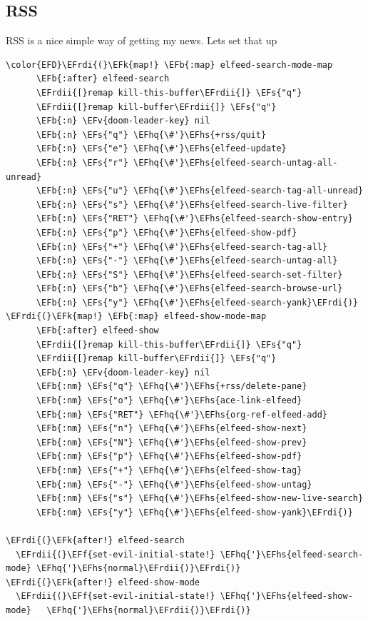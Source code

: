 \documentclass{scrartcl}
\newcommand{\EFk}[1]{\textcolor{EFk}{#1}} %
\newcommand{\EFs}[1]{\textcolor{EFs}{#1}} %
\newcommand{\EFb}[1]{\textcolor{EFb}{#1}} %
\newcommand{\EFv}[1]{\textcolor{EFv}{#1}} %
\newcommand{\EFf}[1]{\textcolor{EFf}{#1}} %
\newcommand{\EFhq}[1]{#1} %
\newcommand{\EFhs}[1]{#1} %
\newcommand{\EFrdi}[1]{#1} %
\newcommand{\EFrdii}[1]{#1} %
\begin{document}
\subsection{RSS}
\label{sec:org187bbc8}
RSS is a nice simple way of getting my news. Lets set that up
\begin{Code}
\begin{Verbatim}[]
\color{EFD}\EFrdi{(}\EFk{map!} \EFb{:map} elfeed-search-mode-map
      \EFb{:after} elfeed-search
      \EFrdii{[}remap kill-this-buffer\EFrdii{]} \EFs{"q"}
      \EFrdii{[}remap kill-buffer\EFrdii{]} \EFs{"q"}
      \EFb{:n} \EFv{doom-leader-key} nil
      \EFb{:n} \EFs{"q"} \EFhq{\#'}\EFhs{+rss/quit}
      \EFb{:n} \EFs{"e"} \EFhq{\#'}\EFhs{elfeed-update}
      \EFb{:n} \EFs{"r"} \EFhq{\#'}\EFhs{elfeed-search-untag-all-unread}
      \EFb{:n} \EFs{"u"} \EFhq{\#'}\EFhs{elfeed-search-tag-all-unread}
      \EFb{:n} \EFs{"s"} \EFhq{\#'}\EFhs{elfeed-search-live-filter}
      \EFb{:n} \EFs{"RET"} \EFhq{\#'}\EFhs{elfeed-search-show-entry}
      \EFb{:n} \EFs{"p"} \EFhq{\#'}\EFhs{elfeed-show-pdf}
      \EFb{:n} \EFs{"+"} \EFhq{\#'}\EFhs{elfeed-search-tag-all}
      \EFb{:n} \EFs{"-"} \EFhq{\#'}\EFhs{elfeed-search-untag-all}
      \EFb{:n} \EFs{"S"} \EFhq{\#'}\EFhs{elfeed-search-set-filter}
      \EFb{:n} \EFs{"b"} \EFhq{\#'}\EFhs{elfeed-search-browse-url}
      \EFb{:n} \EFs{"y"} \EFhq{\#'}\EFhs{elfeed-search-yank}\EFrdi{)}
\EFrdi{(}\EFk{map!} \EFb{:map} elfeed-show-mode-map
      \EFb{:after} elfeed-show
      \EFrdii{[}remap kill-this-buffer\EFrdii{]} \EFs{"q"}
      \EFrdii{[}remap kill-buffer\EFrdii{]} \EFs{"q"}
      \EFb{:n} \EFv{doom-leader-key} nil
      \EFb{:nm} \EFs{"q"} \EFhq{\#'}\EFhs{+rss/delete-pane}
      \EFb{:nm} \EFs{"o"} \EFhq{\#'}\EFhs{ace-link-elfeed}
      \EFb{:nm} \EFs{"RET"} \EFhq{\#'}\EFhs{org-ref-elfeed-add}
      \EFb{:nm} \EFs{"n"} \EFhq{\#'}\EFhs{elfeed-show-next}
      \EFb{:nm} \EFs{"N"} \EFhq{\#'}\EFhs{elfeed-show-prev}
      \EFb{:nm} \EFs{"p"} \EFhq{\#'}\EFhs{elfeed-show-pdf}
      \EFb{:nm} \EFs{"+"} \EFhq{\#'}\EFhs{elfeed-show-tag}
      \EFb{:nm} \EFs{"-"} \EFhq{\#'}\EFhs{elfeed-show-untag}
      \EFb{:nm} \EFs{"s"} \EFhq{\#'}\EFhs{elfeed-show-new-live-search}
      \EFb{:nm} \EFs{"y"} \EFhq{\#'}\EFhs{elfeed-show-yank}\EFrdi{)}

\EFrdi{(}\EFk{after!} elfeed-search
  \EFrdii{(}\EFf{set-evil-initial-state!} \EFhq{'}\EFhs{elfeed-search-mode} \EFhq{'}\EFhs{normal}\EFrdii{)}\EFrdi{)}
\EFrdi{(}\EFk{after!} elfeed-show-mode
  \EFrdii{(}\EFf{set-evil-initial-state!} \EFhq{'}\EFhs{elfeed-show-mode}   \EFhq{'}\EFhs{normal}\EFrdii{)}\EFrdi{)}


\end{Verbatim}
\end{Code}
\end{document}
